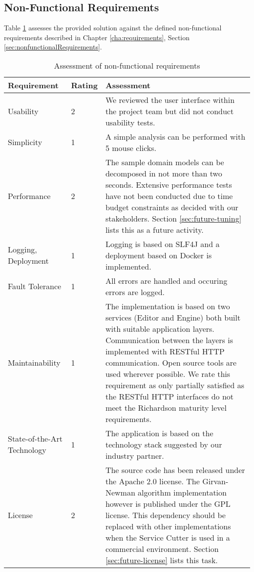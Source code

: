\clearpage
\subsection{Non-Functional Requirements}

Table \ref{tab:conclusionNonFunctional} assesses the provided solution against the defined non-functional requirements described in Chapter \ref{cha:requirements}, Section \ref{sec:nonfunctionalRequirements}. %

\begin{table}[H]
	\centering
	\caption{Assessment of non-functional requirements}
	\label{tab:conclusionNonFunctional}
	\begin{tabular}{|p{100pt}|l|p{250pt}|}
	\hline \textbf{Requirement} & \textbf{Rating} & \textbf{Assessment} \\ 
	\hline Usability & 2 & We reviewed the user interface within the project team but did not conduct usability tests. \\
	\hline Simplicity & 1 & A simple analysis can be performed with 5 mouse clicks. \\
	\hline Performance & 2 & The sample domain models can be decomposed in not more than two seconds. Extensive performance tests have not been conducted due to time budget constraints as decided with our stakeholders. Section \ref{sec:future-tuning} lists this as a future activity. \\
	\hline Logging, \newline Deployment & 1 & Logging is based on SLF4J and a deployment based on Docker is implemented. \\
	\hline Fault Tolerance & 1 & All errors are handled and occuring errors are logged. \\
	\hline Maintainability & 1 & The implementation is based on two services (Editor and Engine) both built with suitable application layers. Communication between the layers is implemented with RESTful HTTP communication. Open source tools are used wherever possible. We rate this requirement as only partially satisfied as the RESTful HTTP interfaces do not meet the Richardson maturity level requirements.  \\
	\hline State-of-the-Art Technology & 1 & The application is based on the technology stack suggested by our industry partner. \\
	\hline License & 2 & The source code has been released under the Apache 2.0 license. The Girvan-Newman algorithm implementation however is published under the GPL license. This dependency should be replaced with other implementations when the Service Cutter is used in a commercial environment. Section \ref{sec:future-license} lists this task. \\
	\hline 
	\end{tabular} 
\end{table}

